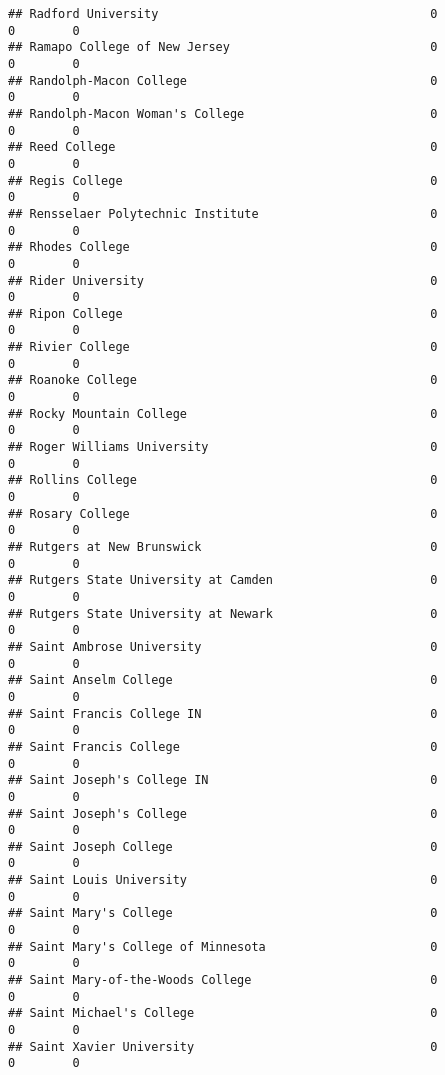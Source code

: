 \documentclass[
]{article}
\begin{document}
\begin{verbatim}
## Radford University                                      0           0        0
## Ramapo College of New Jersey                            0           0        0
## Randolph-Macon College                                  0           0        0
## Randolph-Macon Woman's College                          0           0        0
## Reed College                                            0           0        0
## Regis College                                           0           0        0
## Rensselaer Polytechnic Institute                        0           0        0
## Rhodes College                                          0           0        0
## Rider University                                        0           0        0
## Ripon College                                           0           0        0
## Rivier College                                          0           0        0
## Roanoke College                                         0           0        0
## Rocky Mountain College                                  0           0        0
## Roger Williams University                               0           0        0
## Rollins College                                         0           0        0
## Rosary College                                          0           0        0
## Rutgers at New Brunswick                                0           0        0
## Rutgers State University at Camden                      0           0        0
## Rutgers State University at Newark                      0           0        0
## Saint Ambrose University                                0           0        0
## Saint Anselm College                                    0           0        0
## Saint Francis College IN                                0           0        0
## Saint Francis College                                   0           0        0
## Saint Joseph's College IN                               0           0        0
## Saint Joseph's College                                  0           0        0
## Saint Joseph College                                    0           0        0
## Saint Louis University                                  0           0        0
## Saint Mary's College                                    0           0        0
## Saint Mary's College of Minnesota                       0           0        0
## Saint Mary-of-the-Woods College                         0           0        0
## Saint Michael's College                                 0           0        0
## Saint Xavier University                                 0           0        0

\end{verbatim}
\end{document}
